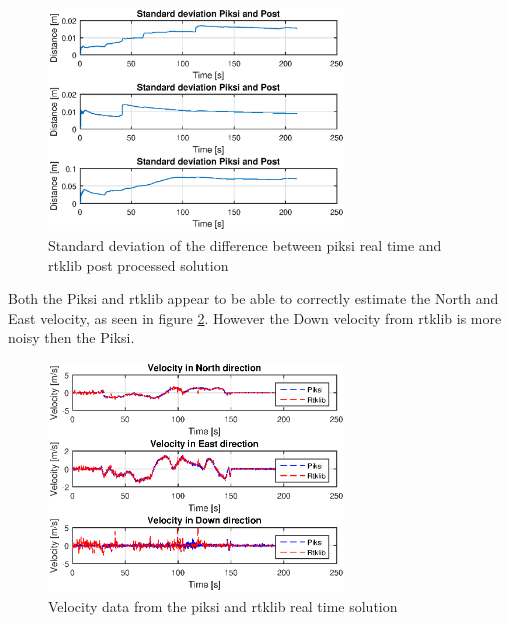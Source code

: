 \begin{figure}[H]
	\centering
		\includegraphics[width=0.7\textwidth]{figs/plots/stdpiksipost.eps}
		\caption{Standard deviation of the difference between piksi real time and rtklib post processed solution}
		\label{figure:stdPiksi}
\end{figure}
Both the Piksi and \gls{rtklib} appear to be able to correctly estimate the North and East velocity, as seen in figure \ref{figure:VelocityWalk1}. However the Down velocity from \gls{rtklib} is more noisy then the Piksi.
\begin{figure}[H]
	\centering
		\includegraphics[width=0.7\textwidth]{figs/plots/velocityWalk1.eps}
		\caption{Velocity data from the piksi and rtklib real time solution}
		\label{figure:VelocityWalk1}
\end{figure}
